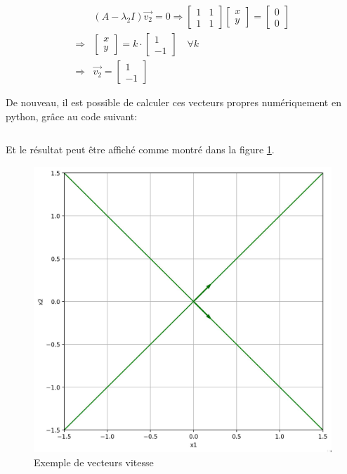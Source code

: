         \begin{equation}
            \begin{split}
                &(A - \lambda_2 I)\overrightarrow{v_2} = 0 \Rightarrow \begin{bmatrix} 1 & 1 \\ 1 & 1 \end{bmatrix} \begin{bmatrix} x \\ y \end{bmatrix} = \begin{bmatrix} 0 \\ 0 \end{bmatrix}\\
                \Rightarrow& \begin{bmatrix} x \\ y \end{bmatrix} = k \cdot \begin{bmatrix} 1 \\ -1 \end{bmatrix} \quad \forall k \\
                \Rightarrow& \overrightarrow{v_2} = \begin{bmatrix} 1 \\ -1 \end{bmatrix}
            \end{split}
        \end{equation}

        De nouveau, il est possible de calculer ces vecteurs propres numériquement en python, grâce au code suivant:
        \inputminted{python}{codes/vecteurs_propres.py}
        Et le résultat peut être affiché comme montré dans la figure \ref{fig:vecteurs_propres}.
        \begin{figure}[ht!]
            \centering
            \includegraphics[width=\textwidth]{images/vecteurs_propres.jpg}
            \caption{Exemple de vecteurs vitesse }
            \label{fig:vecteurs_propres}
        \end{figure}
        
